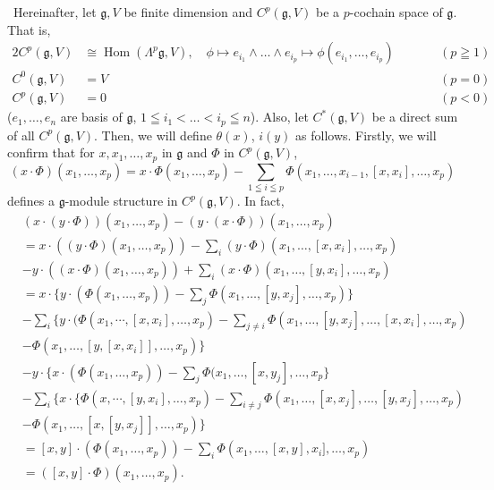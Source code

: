 \documentclass[titlepage,12pt]{article}
\newcommand{\g}{\mathfrak{g}}
\begin{document}
\ Hereinafter, let $\g,V$ be finite dimension and $C^{p}(\mathfrak{g},V)$ be a $p$-cochain space of $\mathfrak{g}$. That is,
\begin{alignat*}{2}
C^{p}(\g,V) &\cong \operatorname{Hom}(\Lambda^{p}\g,V), \quad
\phi \mapsto e_{i_{1}} \wedge \dots \wedge e_{i_{p}} \mapsto
\phi(e_{i_{1}},\dots,e_{i_{p}}) & \qquad & (p \geqq 1) \\
C^{0}(\g,V) &= V & \qquad & (p = 0) \\
C^{p}(\g,V) &= {0} & \qquad & (p<0)
\end{alignat*}
($e_{1},\dots,e_{n}$ are basis of $\g$, $1 \leqq i_{1} < \dots < i_{p} \leqq n$). Also,
let $C^{*}(\g,V)$ be a direct sum of all $C^{p}(\g,V)$. Then, we will define $\theta(x)$,
$i(y)$ as follows. Firstly, we will confirm that for $x,x_{1},\dots,x_{p}$ in $\g$ and $\Phi$ in $C^{p}(\g,V)$,
\begin{equation*}
(x \cdot \Phi)(x_{1},\dots,x_{p})=x \cdot
\Phi(x_{1},\dots,x_{p}) - \sum_{1\leqq i \leqq p} \Phi
(x_{1},\dots,x_{i-1},[x,x_{i}],\dots,x_{p}) \tag{$\ast$}
\end{equation*}
defines a $\g$-module structure in $C^{p}(\g,V)$. In fact,
\begin{align*}
&(x \cdot(y \cdot \Phi))(x_{1},\dots,x_{p})-(y \cdot (x \cdot
\Phi))(x_{1},\dots,x_{p}) \\
&= x \cdot ((y \cdot \Phi)(x_{1},\dots,x_{p})) - \sum_{i}(y
\cdot \Phi)(x_{1},\dots,[x,x_{i}],\dots,x_{p}) \\
& -y \cdot((x \cdot \Phi)(x_{1},\dots,x_{p}))+\sum_{i}(x \cdot
\Phi)(x_{1},\dots,[y,x_{i}],\dots,x_{p}) \\
&=x \cdot \{y \cdot
(\Phi(x_{1},\dots,x_{p}))-\sum_{j}\Phi(x_{1},\dots,[y,x_{j}],\dots,x_{p})\}
\\
& -\sum_{i}\{y \cdot (\Phi(x_{1},\cdots,[x,x_{i}],\dots,x_{p}) -
\sum_{j \neq
i}\Phi(x_{1},\dots,[y,x_{j}],\dots,[x,x_{i}],\dots,x_{p}) \\
&　-\Phi(x_{1},\dots,[y,[x,x_{i}]],\dots,x_{p})\} \\
& -y \cdot \{x \cdot (\Phi(x_{1},\dots,x_{p})) -
\sum_{j}\Phi(x_{1},\dots,[x,y_{j}],\dots,x_{p}\} \\
& -\sum_{i}\{x \cdot
\{\Phi(x,\cdots,[y,x_{i}],\dots,x_{p})-\sum_{i \neq
j}\Phi(x_{1},\dots,[x,x_{j}],\dots,[y,x_{j}],\dots,x_{p}) \\
&　-\Phi(x_{1},\dots,[x,[y,x_{j}]],\dots,x_{p})\} \\
&= [x,y] \cdot
(\Phi(x_{1},\dots,x_{p}))-\sum_{i}\Phi(x_{1},\dots,[x,y],x_{i}],\dots,x_{p})
\\
&=([x,y] \cdot \Phi)(x_{1},\dots,x_{p}).
\end{align*}
\end{document}
